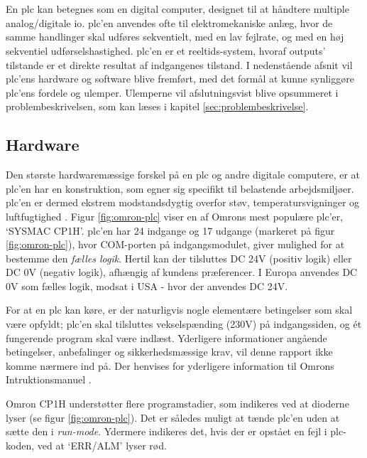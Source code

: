 \section{}
En \gls{plc} kan betegnes som en digital computer, designet til at håndtere multiple analog/digitale \gls{io}. \gls{plc}'en anvendes ofte til elektromekaniske anlæg, hvor de samme handlinger skal udføres sekventielt, med en lav fejlrate, og med en høj sekventiel udførselshastighed. \gls{plc}'en er et reeltids-system, hvoraf outputs' tilstande er et direkte resultat af indgangenes tilstand. I nedenstående afsnit vil \gls{plc}'ens hardware og software blive fremført, med det formål at kunne synliggøre \gls{plc}'ens fordele og ulemper. Ulemperne vil afslutningsvist blive opsummeret i problembeskrivelsen, som kan læses i kapitel \ref{sec:problembeskrivelse}. 

\subsection{Hardware}
\label{subsec:pa-hardware}
Den største hardwaremæssige forskel på en \gls{plc} og andre digitale computere, er at \gls{plc}'en har en konstruktion, som egner sig specifikt til belastende arbejdsmiljøer. \gls{plc}'en er dermed ekstrem modstandsdygtig overfor støv, temperatursvigninger og luftfugtighed \cite{PLC_hardware_desc}. 
Figur \ref{fig:omron-plc} viser en af Omrons mest populære \gls{plc}'er, \enquote*{SYSMAC CP1H}. \gls{plc}'en har 24 indgange og 17 udgange (markeret på figur \ref{fig:omron-plc}), hvor COM-porten på indgangsmodulet, giver mulighed for at bestemme den \textit{fælles logik}. Hertil kan der tilsluttes DC 24V (positiv logik) eller DC 0V (negativ logik), afhængig af kundens præferencer. I Europa anvendes DC 0V som fælles logik, modsat i USA - hvor der anvendes DC 24V. 

For at en \gls{plc} kan køre, er der naturligvis nogle elementære betingelser som skal være opfyldt; \gls{plc}'en skal tilsluttes vekselspænding (230V) på indgangssiden, og ét fungerende program skal være indlæst. Yderligere informationer angående betingelser, anbefalinger og sikkerhedsmæssige krav, vil denne rapport ikke komme nærmere ind på. Der henvises for yderligere information til Omrons Intruktionsmanuel \cite{basic_knowledge_plc}.

Omron CP1H understøtter flere programstadier, som indikeres ved at dioderne lyser (se figur \ref{fig:omron-plc}). Det er således muligt at tænde \gls{plc}'en uden at sætte den i \textit{run-mode}. Ydermere indikeres det, hvis der er opstået en fejl i \gls{plc}-koden, ved at \enquote*{ERR/ALM} lyser rød. 

